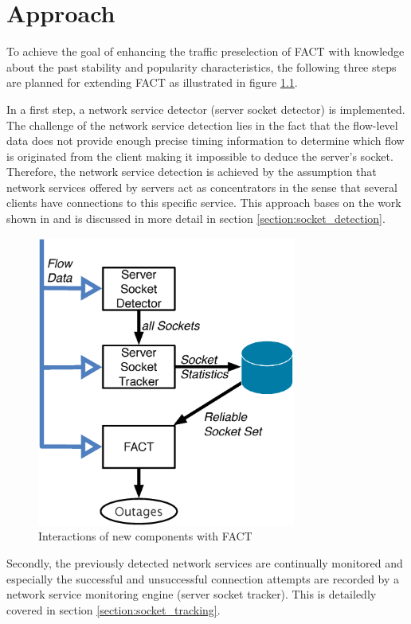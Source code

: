 \chapter{Approach
\label{chapter:approach}}

To achieve the goal of enhancing the traffic preselection of \gls{FACT} with knowledge about the past stability and popularity characteristics, the following three steps are planned for extending \gls{FACT} as illustrated in figure  \ref{fig:FACT}.

In a first step, a network service detector (server socket detector) is  implemented. 
The challenge of the network service detection lies in the fact  that the flow-level data does not provide enough precise timing information to  determine which flow is originated from the client making it impossible to deduce the server's socket\citep{Trammell}. 
Therefore, the network service detection is achieved by the assumption that network services offered by servers act as concentrators in the sense that several clients have connections to this specific service. 
This approach bases on the work shown in \cite{Schatzmann:Dissection, Schatzmann:Mining, Schatzmann:Tracing} and is discussed in more detail in section \ref{section:socket_detection}.

\begin{figure}
	[t] \centering
	\includegraphics[width=8.5cm]{images/Approach_blockdiagram.eps}
	\caption{Interactions of new components with \gls{FACT}} 
	\label{fig:FACT} 
\end{figure}

Secondly, the previously detected network services are continually monitored and especially the successful and unsuccessful connection attempts are recorded by a network service monitoring engine (server socket tracker). This is detailedly covered in section \ref{section:socket_tracking}.

